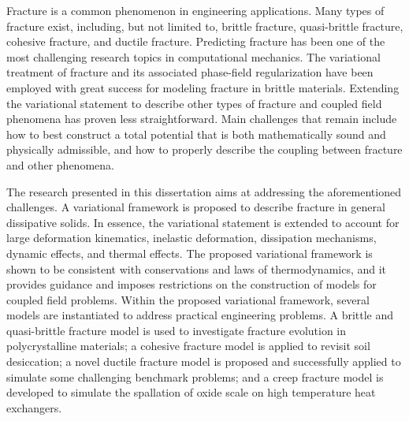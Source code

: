 \abstract

Fracture is a common phenomenon in engineering applications. Many types of fracture exist, including, but not limited to, brittle fracture, quasi-brittle fracture, cohesive fracture, and ductile fracture. Predicting fracture has been one of the most challenging research topics in computational mechanics. The variational treatment of fracture and its associated phase-field regularization have been employed with great success for modeling fracture in brittle materials. Extending the variational statement to describe other types of fracture and coupled field phenomena has proven less straightforward. Main challenges that remain include how to best construct a total potential that is both mathematically sound and physically admissible, and how to properly describe the coupling between fracture and other phenomena.

The research presented in this dissertation aims at addressing the aforementioned challenges. A variational framework is proposed to describe fracture in general dissipative solids. In essence, the variational statement is extended to account for large deformation kinematics, inelastic deformation, dissipation mechanisms, dynamic effects, and thermal effects. The proposed variational framework is shown to be consistent with conservations and laws of thermodynamics, and it provides guidance and imposes restrictions on the construction of models for coupled field problems. Within the proposed variational framework, several models are instantiated to address practical engineering problems. A brittle and quasi-brittle fracture model is used to investigate fracture evolution in polycrystalline materials; a cohesive fracture model is applied to revisit soil desiccation; a novel ductile fracture model is proposed and successfully applied to simulate some challenging benchmark problems; and a creep fracture model is developed to simulate the spallation of oxide scale on high temperature heat exchangers.
